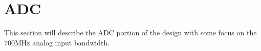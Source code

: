 \section{ADC} %
    This section will describe the ADC portion of the design with some focus on the 700MHz
    analog input bandwidth.
